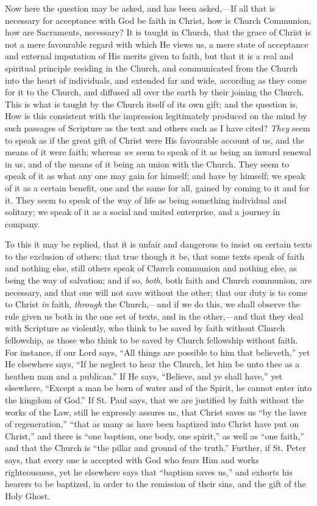 Now here the question may be asked, and has been asked,—If all
that is necessary for acceptance with God be faith in Christ, how is
Church Communion, how are Sacraments, necessary? It is taught in
Church, that the grace of Christ is not a mere favourable regard with
which He views us, a mere state of acceptance and external imputation
of His merits given to faith, but that it is a real and spiritual
principle residing in the Church, and communicated from the Church
into the heart of individuals, and extended far and wide, according as
they come for it to the Church, and diffused all over the earth by
their joining the Church. This is what is taught by the Church itself
of its own gift; and the question is, How is this consistent with the
impression legitimately produced on the mind by such passages of
Scripture as the text and others such as I have cited? \emph{They}
seem to speak as if the great gift of Christ were His favourable
account of us, and the means of it were faith; whereas \emph{we} seem
to speak of it as being an inward renewal in us, and of the means of
it being an union with the Church. They seem to speak of it as what
any one may gain for himself; and have by himself; we speak of it as a
certain benefit, one and the same for all, gained by coming to it and
for it. They seem to speak of the way of life as being something
individual and solitary; we speak of it as a social and united
enterprise, and a journey in company.

To this it may be replied, that it is unfair and dangerous to
insist on certain texts to the exclusion of others; that true though
it be, that some texts speak of faith and nothing else, still others
speak of Church communion and nothing else, as being the way of
salvation; and if so, \emph{both}, both faith and Church communion,
are necessary, and that one will not save without the other; that our
duty is to come to Christ \emph{in} faith, \emph{through} the Church,—and
if we do this, we shall observe the rule given us both in the one set
of texts, and in the other,—and that they deal with Scripture as
violently, who think to be saved by faith without Church fellowship,
as those who think to be saved by Church fellowship without faith. For
instance, if our Lord says, ``All things are possible to him that
believeth,'' yet He elsewhere says, ``If he neglect to hear
the Church, let him be unto thee as a heathen man and a
publican.'' If He says, ``Believe, and ye shall have,''
yet elsewhere, ``Except a man be born of water and of the Spirit,
he cannot enter into the kingdom of God.'' If St. Paul says, that
we are justified by faith without the works of the Law, still he
expressly assures us, that Christ saves us ``by the laver of
regeneration,'' ``that as many as have been baptized into
Christ have put on Christ,'' and there is ``one baptism, one
body, one spirit,'' as well as ``one faith,'' and that the
Church is ``the pillar and ground of the truth.'' Further, if
St. Peter says, that every one is accepted with God who fears Him and
works righteousness, yet he elsewhere says that ``baptism saves
us,'' and exhorts his hearers to be baptized, in order to the
remission of their sins, and the gift of the Holy Ghost.

